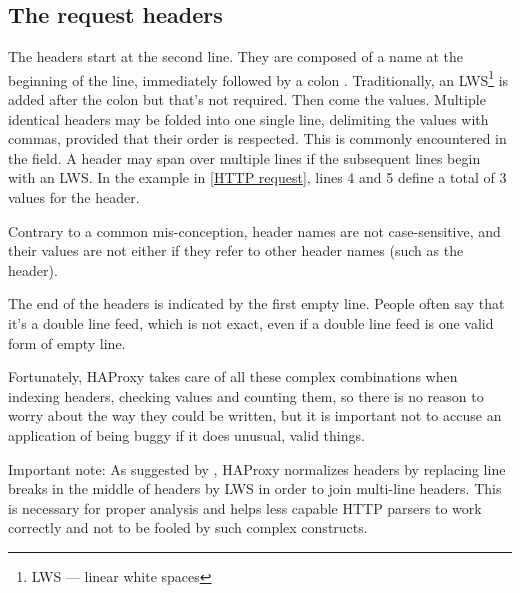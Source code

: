 
\subsection{The request headers}

The headers start at the second line. They are composed of a name at the
beginning of the line, immediately followed by a colon \CHAR{:}. Traditionally,
an LWS\footnote{LWS --- linear white spaces} is added after the colon but 
that's not required. Then come the values.
Multiple identical headers may be folded into one single line, delimiting the
values with commas, provided that their order is respected. This is commonly
encountered in the  field. A header may span over multiple lines if
the subsequent lines begin with an LWS. In the example in \autoref{HTTP request},
lines 4 and 5 define a total of 3 values for the  header.

Contrary to a common mis-conception, header names are not case-sensitive, and
their values are not either if they refer to other header names (such as the
 header).

The end of the headers is indicated by the first empty line. People often say
that it's a double line feed, which is not exact, even if a double line feed
is one valid form of empty line.

Fortunately, HAProxy takes care of all these complex combinations when indexing
headers, checking values and counting them, so there is no reason to worry
about the way they could be written, but it is important not to accuse an
application of being buggy if it does unusual, valid things.

\note Important note:
   As suggested by , HAProxy normalizes headers by replacing line breaks
   in the middle of headers by LWS in order to join multi-line headers. This
   is necessary for proper analysis and helps less capable HTTP parsers to work
   correctly and not to be fooled by such complex constructs.


